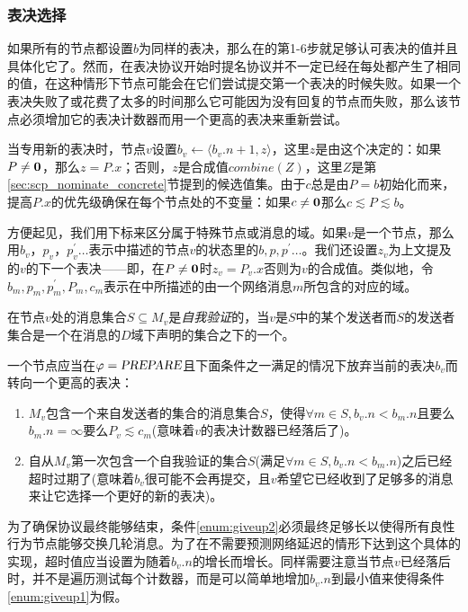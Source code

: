\subsubsection{表决选择}

如果所有的节点都设置$b$为同样的表决，那么在的第1-6步就足够认可表决的值并且具体化它了。然而，在表决协议开始时提名协议并不一定已经在每处都产生了相同的值，在这种情形下节点可能会在它们尝试提交第一个表决的时候失败。如果一个表决失败了或花费了太多的时间那么它可能因为没有回复的节点而失败，那么该节点必须增加它的表决计数器而用一个更高的表决来重新尝试。

当专用新的表决时，节点$v$设置$b_v\leftarrow \langle b_v.n+1,z\rangle$，这里$z$是由这个决定的：如果$P\neq {\bm 0}$，那么$z=P.x$；否则，$z$是合成值$combine(Z)$，这里$Z$是第\ref{sec:scp_nominate_concrete}节提到的候选值集。由于$c$总是由$P=b$初始化而来，提高$P.x$的优先级确保在每个节点处的不变量：如果$c\neq {\bm 0}$那么$c\lesssim P\lesssim b$。

方便起见，我们用下标来区分属于特殊节点或消息的域。如果$v$是一个节点，那么用$b_v$，$p_v$，$p_v^{\prime}\ldots$表示中描述的节点$v$的状态里的$b,p,p^{\prime}\ldots$。我们还设置$z_v$为上文提及的$v$的下一个表决——即，在$P\neq {\bm 0}$时$z_v=P_v.x$否则为$v$的合成值。类似地，令$b_m,p_m,p^{\prime}_m,P_m,c_m$表示在中所描述的由一个网络消息$m$所包含的对应的域。

\begin{definition}[自我验证]
	在节点$v$处的消息集合$S\subseteq M_v$是\textit{自我验证}的，当$v$是$S$中的某个发送者而$S$的发送者集合是一个在消息的$D$域下声明的{\quorum}集合之下的一个{\quorum}。
\end{definition}

一个节点应当在$\varphi=\textsl{PREPARE}$且下面条件之一满足的情况下放弃当前的表决$b_v$而转向一个更高的表决：

\begin{enumerate}
	\item\label{enum:giveup1} $M_v$包含一个来自发送者的{\vblock}集合的消息集合$S$，使得$\forall m\in S,b_v.n<b_m.n$且要么$b_m.n=\infty$要么$P_v\lesssim c_m$(意味着$v$的表决计数器已经落后了)。
	\item\label{enum:giveup2} 自从$M_v$第一次包含一个自我验证的集合$S$(满足$\forall m\in S,b_v.n<b_m.n$)之后已经超时过期了(意味着$b_v$很可能不会再提交，且$v$希望它已经收到了足够多的消息来让它选择一个更好的新的表决)。
\end{enumerate}

为了确保协议最终能够结束，条件\ref{enum:giveup2}必须最终足够长以使得所有良性行为节点能够交换几轮消息。为了在不需要预测网络延迟的情形下达到这个具体的实现，超时值应当设置为随着$b_v.n$的增长而增长。同样需要注意当节点$v$已经落后时，并不是遍历测试每个计数器，而是可以简单地增加$b_v.n$到最小值来使得条件\ref{enum:giveup1}为假。